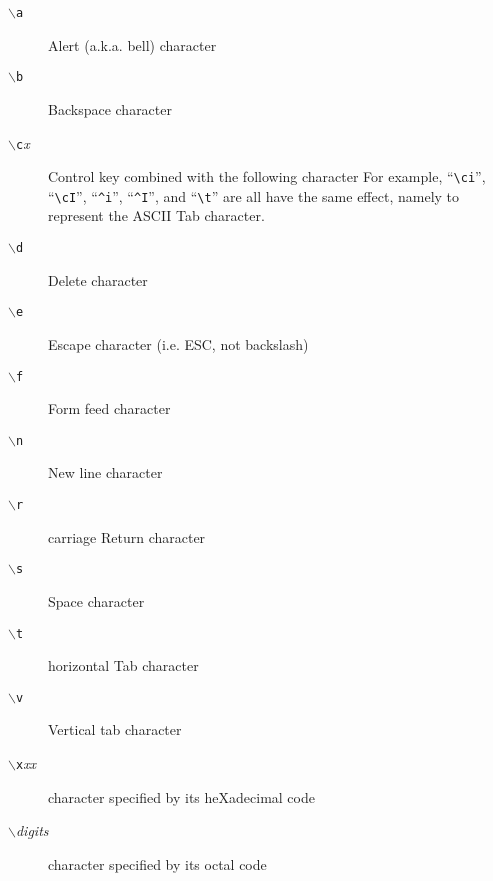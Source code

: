 \begin{description}
\item[{\tt $\backslash$a}]
Alert (a.k.a. bell) character
\item[{\tt $\backslash$b}]
Backspace character
\item[{\tt $\backslash$c}{\it x}]
Control key combined with the following character
For example, ``\verb/\ci/'', ``\verb/\cI/'', ``\verb/^i/'', ``\verb/^I/'',
and ``\verb/\t/'' are all have the same effect, namely to represent the
ASCII Tab character.
\item[{\tt $\backslash$d}]
Delete character
\item[{\tt $\backslash$e}]
Escape character (i.e. ESC, not backslash)
\item[{\tt $\backslash$f}]
Form feed character
\item[{\tt $\backslash$n}]
New line character
\item[{\tt $\backslash$r}]
carriage Return character
\item[{\tt $\backslash$s}]
Space character
\item[{\tt $\backslash$t}]
horizontal Tab character
\item[{\tt $\backslash$v}]
Vertical tab character
\item[{\tt $\backslash$x}{\it xx}]
character specified by its heXadecimal code
\item[{\tt $\backslash$}{\it digits}]
character specified by its octal code


\end{description}
